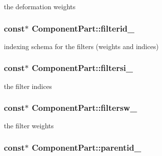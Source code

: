 the deformation weights 

\hypertarget{classComponentPart_aba9023613a7dd450b2403fd7c1e708ec}{}
\subsubsection[{filterid\+\_\+}]{ const$\ast$ Component\+Part\+::filterid\+\_\+\hspace{0.3cm}{\ttfamily [private]}}\label{classComponentPart_aba9023613a7dd450b2403fd7c1e708ec}


indexing schema for the filters (weights and indices) 

\hypertarget{classComponentPart_ab27e6ea4e7d5b1342ca8b55afa797da9}{}
\subsubsection[{filtersi\+\_\+}]{ const$\ast$ Component\+Part\+::filtersi\+\_\+\hspace{0.3cm}{\ttfamily [private]}}\label{classComponentPart_ab27e6ea4e7d5b1342ca8b55afa797da9}


the filter indices 

\hypertarget{classComponentPart_a301c8633b1e8db3f30436c0ba0fc140d}{}
\subsubsection[{filtersw\+\_\+}]{ const$\ast$ Component\+Part\+::filtersw\+\_\+\hspace{0.3cm}{\ttfamily [private]}}\label{classComponentPart_a301c8633b1e8db3f30436c0ba0fc140d}


the filter weights 

\hypertarget{classComponentPart_a3c75a843f04e4b3d56e4461f8ef803fa}{}
\subsubsection[{parentid\+\_\+}]{ const$\ast$ Component\+Part\+::parentid\+\_\+\hspace{0.3cm}{\ttfamily [private]}}\label{classComponentPart_a3c75a843f04e4b3d56e4461f8ef803fa}


